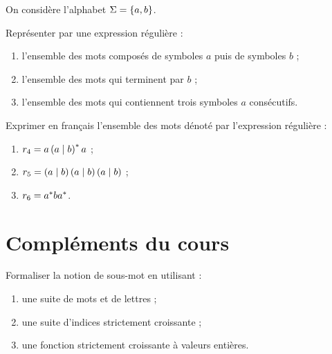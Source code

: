 \begin{exo}
On considère l'alphabet \(\Sigma=\left\lbrace a,b\right\rbrace\).

Représenter par une expression régulière :

\begin{enumerate}[series=ex1.3]
    \item l'ensemble des mots composés de symboles \(a\) puis de symboles \(b\) ; \\
    \item l'ensemble des mots qui terminent par \(b\) ; \\
    \item l'ensemble des mots qui contiennent trois symboles \(a\) consécutifs.
\end{enumerate}

Exprimer en français l'ensemble des mots dénoté par l'expression régulière :

\begin{enumerate}[resume=ex1.3]
    \item \(r_4=a\left(a\mid b\right)^{*} a\) ; \\
    \item \(r_5=\left(a\mid b\right)\left(a\mid b\right)\left(a\mid b\right)\) ; \\
    \item \(r_6=a^{*} ba^{*}\).
\end{enumerate}
\end{exo}

\begin{corr}
\end{corr}

\section*{Compléments du cours}

\begin{exo}
Formaliser la notion de sous-mot en utilisant :

\begin{enumerate}
    \item une suite de mots et de lettres ; \\
    \item une suite d'indices strictement croissante ; \\
    \item une fonction strictement croissante à valeurs entières.
\end{enumerate}
\end{exo}

